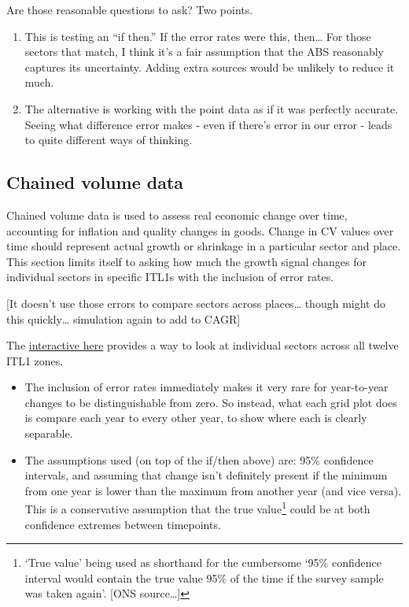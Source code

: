 \documentclass[
  letterpaper,
  DIV=11,
  numbers=noendperiod]{scrartcl}
\begin{document}
Are those reasonable questions to ask? Two points.

\begin{enumerate}
\def\labelenumi{\arabic{enumi}.}
\item
  This is testing an ``if then.'' If the error rates were this,
  then\ldots{} For those sectors that match, I think it's a fair
  assumption that the ABS reasonably captures its uncertainty. Adding
  extra sources would be unlikely to reduce it much.
\item
  The alternative is working with the point data as if it was perfectly
  accurate. Seeing what difference error makes - even if there's error
  in our error - leads to quite different ways of thinking.
\end{enumerate}

\subsection{Chained volume data}\label{chained-volume-data}

Chained volume data is used to assess real economic change over time,
accounting for inflation and quality changes in goods. Change in CV
values over time should represent actual growth or shrinkage in a
particular sector and place. This section limits itself to asking how
much the growth signal changes for individual sectors in specific ITL1s
with the inclusion of error rates.

{[}It doesn't use those errors to compare sectors across places\ldots{}
though might do this quickly\ldots{} simulation again to add to CAGR{]}

The
\href{https://danolner.github.io/RegEconWorks/growth_errorgrids_viewer/}{interactive
here} provides a way to look at individual sectors across all twelve
ITL1 zones.

\begin{itemize}
\item
  The inclusion of error rates immediately makes it very rare for
  year-to-year changes to be distinguishable from zero. So instead, what
  each grid plot does is compare each year to every other year, to show
  where each is clearly separable.
\item
  The assumptions used (on top of the if/then above) are: 95\%
  confidence intervals, and assuming that change isn't definitely
  present if the minimum from one year is lower than the maximum from
  another year (and vice versa). This is a conservative assumption that
  the true value\footnote{`True value' being used as shorthand for the
    cumbersome `95\% confidence interval would contain the true value
    95\% of the time if the survey sample was taken again'. {[}ONS
    source\ldots{]}} could be at both confidence extremes between
  timepoints.
\end{itemize}
\end{document}
